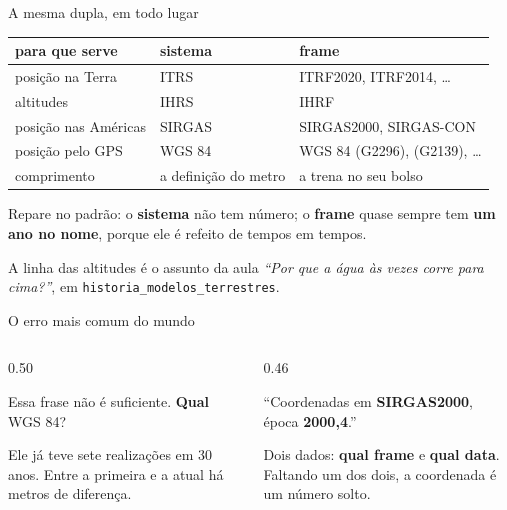 \documentclass[aspectratio=169,11pt]{beamer}
\newcommand{\bnum}[1]{\textbf{\textcolor{mTeal}{#1}}}
\newcommand{\sist}[1]{\textcolor{corSist}{\textbf{#1}}}
\newcommand{\fram}[1]{\textcolor{corFrame}{\textbf{#1}}}
\begin{document}
\begin{frame}{A mesma dupla, em todo lugar}
  \centering
  \small
  \renewcommand{\arraystretch}{1.4}
  \begin{tabular}{lll}
    \toprule
    para que serve & \sist{sistema} & \fram{frame} \\
    \midrule
    posição na Terra & ITRS & ITRF2020, ITRF2014, \ldots \\
    altitudes & IHRS & IHRF \\
    posição nas Américas & SIRGAS & SIRGAS2000, SIRGAS-CON \\
    posição pelo GPS & WGS 84 & WGS 84 (G2296), (G2139), \ldots \\
    comprimento & a definição do metro & a trena no seu bolso \\
    \bottomrule
  \end{tabular}
  \bigskip

  Repare no padrão: o \sist{sistema} não tem número; o \fram{frame} quase sempre tem
  \bnum{um ano no nome}, porque ele é refeito de tempos em tempos.
  \medskip

  {\small\textcolor{mStoneMid}{A linha das altitudes é o assunto da aula
  \emph{``Por que a água às vezes corre para cima?''}, em
  \texttt{historia\_modelos\_terrestres}.}}
\end{frame}

\begin{frame}{O erro mais comum do mundo}
  \begin{columns}[T]
    \begin{column}{0.50\textwidth}
      \begin{armadilha}[title={``Minhas coordenadas estão em WGS 84''}]
        Essa frase não é suficiente. \textbf{Qual} WGS 84?
        \medskip

        Ele já teve \alert{sete realizações} em 30 anos. Entre a primeira e a atual há
        metros de diferença.
      \end{armadilha}
    \end{column}
    \begin{column}{0.46\textwidth}
      \begin{ideia}[title={A frase completa}]
        ``Coordenadas em \fram{SIRGAS2000}, época \textcolor{corTempo}{\textbf{2000,4}}.''
        \medskip

        Dois dados: \bnum{qual frame} e \bnum{qual data}. Faltando um dos dois, a
        coordenada é um número solto.
      \end{ideia}
    \end{column}
  \end{columns}
\end{frame}
\end{document}
